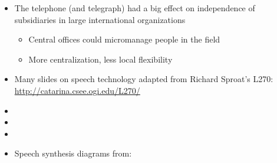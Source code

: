 \documentclass[a4paper,landscape,headrule,footrule,xetex]{foils}
\begin{document}







\begin{itemize}
\item The telephone (and telegraph) had a big effect on independence
  of subsidiaries in large international organizations \citep{Parkinson:1958}
  \begin{itemize}
  \item Central offices could micromanage people in the field
  \item More centralization, less local flexibility 
  \end{itemize}
\end{itemize}



\begin{itemize}
\item Many slides on speech technology adapted from Richard Sproat's L270: 
  \\ \url{http://catarina.csee.ogi.edu/L270/}
\item {}
\item {}
\item {}
\item Speech synthesis diagrams from: 
\end{itemize}




\end{document}
